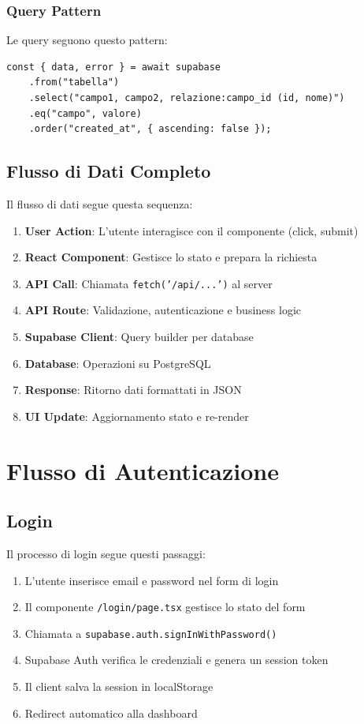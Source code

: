 \documentclass{article}
\begin{document}
\subsubsection{Query Pattern}
Le query seguono questo pattern:

\begin{lstlisting}
const { data, error } = await supabase
    .from("tabella")
    .select("campo1, campo2, relazione:campo_id (id, nome)")
    .eq("campo", valore)
    .order("created_at", { ascending: false });
\end{lstlisting}

\subsection{Flusso di Dati Completo}

Il flusso di dati segue questa sequenza:

\begin{enumerate}[leftmargin=*]
\item \textbf{User Action}: L'utente interagisce con il componente (click, submit)
\item \textbf{React Component}: Gestisce lo stato e prepara la richiesta
\item \textbf{API Call}: Chiamata \texttt{fetch('/api/...')} al server
\item \textbf{API Route}: Validazione, autenticazione e business logic
\item \textbf{Supabase Client}: Query builder per database
\item \textbf{Database}: Operazioni su PostgreSQL
\item \textbf{Response}: Ritorno dati formattati in JSON
\item \textbf{UI Update}: Aggiornamento stato e re-render
\end{enumerate}

\section{Flusso di Autenticazione}

\subsection{Login}

Il processo di login segue questi passaggi:

\begin{enumerate}[leftmargin=*]
\item L'utente inserisce email e password nel form di login
\item Il componente \texttt{/login/page.tsx} gestisce lo stato del form
\item Chiamata a \texttt{supabase.auth.signInWithPassword()}
\item Supabase Auth verifica le credenziali e genera un session token
\item Il client salva la session in localStorage
\item Redirect automatico alla dashboard
\end{enumerate}
\end{document}
